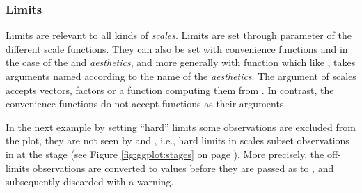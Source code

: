 \documentclass[krantz2]{krantz}\usepackage{knitr}
\begin{document}
\subsubsection{Limits}

Limits are relevant to all kinds of \emph{scales}. Limits are set through parameter  of the different scale functions. They can also be set with convenience functions  and  in the case of the  and  \emph{aesthetics}, and more generally with function  which like , takes arguments named according to the name of the \emph{aesthetics}. The  argument of scales accepts vectors, factors or a function computing them from . In contrast, the convenience functions do not accept functions as their arguments.

In the next example by setting ``hard'' limits some observations are excluded from the plot, they are not seen by  and , i.e., hard limits in scales subset observations in  at the  stage (see Figure \ref{fig:ggplot:stages} on page \pageref{fig:ggplot:stages}). More precisely, the off-limits observations are converted to  values before they are passed as  to , and subsequently discarded with a warning.



\begin{knitrout}\footnotesize
{}\color{fgcolor}\begin{kframe}
\begin{alltt}
 \hlkwb{<-}
  \hlstd{(}   \hlstd{=} \hlstd{(}    \hlopt{+}
  \hlstd{()}
\end{alltt}
\end{kframe}
\end{knitrout}

\begin{knitrout}\footnotesize
{}\color{fgcolor}\begin{kframe}
\begin{alltt}
 \hlkwb{<-}  \hlopt{+} \hlstd{(} \hlstd{=} \hlstd{(}\hlstd{,} \hlstd{))}
\end{alltt}
\end{kframe}
\end{knitrout}
\end{document}
